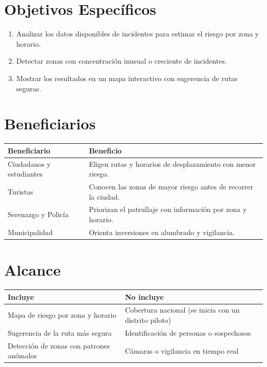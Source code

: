 \documentclass[11pt,a4paper]{article}
\begin{document}
\section{Objetivos Específicos}
\begin{enumerate}[leftmargin=*]
    \item Analizar los datos disponibles de incidentes para estimar el riesgo por zona y horario.
    \item Detectar zonas con concentración inusual o creciente de incidentes.
    \item Mostrar los resultados en un mapa interactivo con sugerencia de rutas seguras.
\end{enumerate}

\section{Beneficiarios}
{\small
\noindent\begin{tabularx}{\textwidth}{@{}P{4.2cm} L@{}}
\toprule
{}
\textbf{Beneficiario} & \textbf{Beneficio} \\
\midrule
Ciudadanos y estudiantes & Eligen rutas y horarios de desplazamiento con menor riesgo. \\
Turistas & Conocen las zonas de mayor riesgo antes de recorrer la ciudad. \\
Serenazgo y Policía & Priorizan el patrullaje con información por zona y horario. \\
Municipalidad & Orienta inversiones en alumbrado y vigilancia. \\
\bottomrule
\end{tabularx}
}

\section{Alcance}
{\small
\noindent\begin{tabularx}{\textwidth}{@{}L L@{}}
\toprule
{}
\textbf{Incluye} & \textbf{No incluye} \\
\midrule
Mapa de riesgo por zona y horario & Cobertura nacional (se inicia con un distrito piloto) \\
Sugerencia de la ruta más segura & Identificación de personas o sospechosos \\
Detección de zonas con patrones anómalos & Cámaras o vigilancia en tiempo real \\
\bottomrule
\end{tabularx}
}
\end{document}

